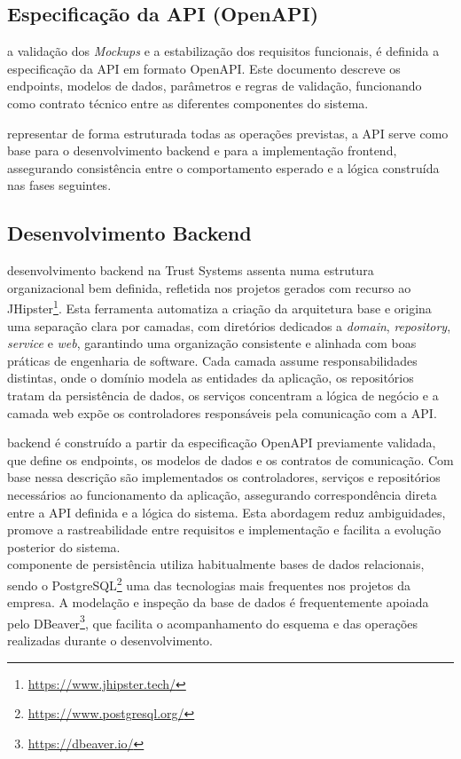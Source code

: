 \subsection{Especificação da API (OpenAPI)}

 a validação dos \textit{Mockups} e a estabilização dos requisitos funcionais, é definida a especificação da API em formato OpenAPI. Este documento descreve os endpoints, modelos de dados, parâmetros e regras de validação, funcionando como contrato técnico entre as diferentes componentes do sistema.

 representar de forma estruturada todas as operações previstas, a API serve como base para o desenvolvimento backend e para a implementação frontend, assegurando consistência entre o comportamento esperado e a lógica construída nas fases seguintes.

\subsection{Desenvolvimento Backend}

 desenvolvimento backend na Trust Systems assenta numa estrutura organizacional bem definida, refletida nos projetos gerados com recurso ao JHipster\footnote{\url{https://www.jhipster.tech/}}. Esta ferramenta automatiza a criação da arquitetura base e origina uma separação clara por camadas, com diretórios dedicados a \textit{domain}, \textit{repository}, \textit{service} e \textit{web}, garantindo uma organização consistente e alinhada com boas práticas de engenharia de software. Cada camada assume responsabilidades distintas, onde o domínio modela as entidades da aplicação, os repositórios tratam da persistência de dados, os serviços concentram a lógica de negócio e a camada web expõe os controladores responsáveis pela comunicação com a API.

 backend é construído a partir da especificação OpenAPI previamente validada, que define os endpoints, os modelos de dados e os contratos de comunicação. Com base nessa descrição são implementados os controladores, serviços e repositórios necessários ao funcionamento da aplicação, assegurando correspondência direta entre a API definida e a lógica do sistema. Esta abordagem reduz ambiguidades, promove a rastreabilidade entre requisitos e implementação e facilita a evolução posterior do sistema.\\

 componente de persistência utiliza habitualmente bases de dados relacionais, sendo o PostgreSQL\footnote{\url{https://www.postgresql.org/}} uma das tecnologias mais frequentes nos projetos da empresa. A modelação e inspeção da base de dados é frequentemente apoiada pelo DBeaver\footnote{\url{https://dbeaver.io/}}, que facilita o acompanhamento do esquema e das operações realizadas durante o desenvolvimento.

